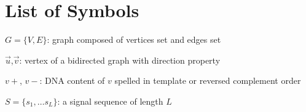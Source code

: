\chapter{List of Symbols}

\begin{list}{}{%
\setlength{\labelwidth}{24mm}
\setlength{\leftmargin}{34mm}}
\item[$G=\{V,E\}$:] graph composed of vertices set and edges set
\item[$\overrightarrow{u}$,$\overrightarrow{v}$:] vertex of a bidirected graph with direction property
\item[$v+$, $v-$:] DNA content of $v$ spelled in template or reversed complement order
\item[$S=\{s_1, \ldots s_L\}$:] a signal sequence of length $L$
\end{list}
